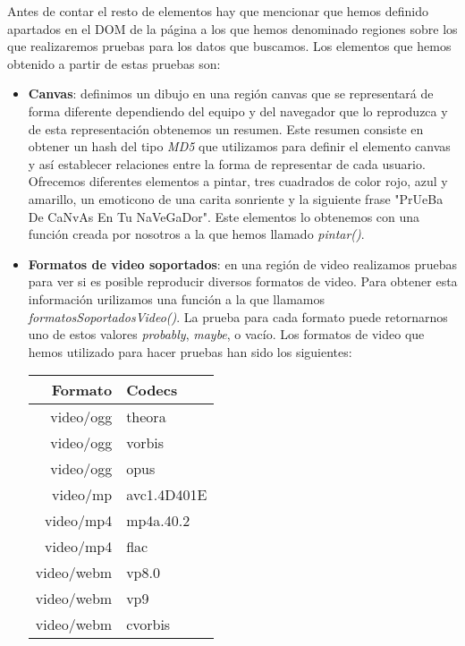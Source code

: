 \noindent  Antes de contar el resto de elementos hay que mencionar que hemos definido apartados en el DOM de la página a los que hemos denominado regiones sobre los que realizaremos pruebas para los datos que buscamos. Los elementos que hemos obtenido a partir de estas pruebas son:
\begin{itemize} 
    \item \textbf{Canvas}: definimos un dibujo en una región canvas que se representará de forma diferente dependiendo del equipo y del navegador que lo reproduzca y de esta representación obtenemos un resumen. Este resumen consiste en obtener un hash del tipo \textit{MD5} que utilizamos para definir el elemento canvas y así establecer relaciones entre la forma de representar de cada usuario. Ofrecemos diferentes elementos a pintar, tres cuadrados de color rojo, azul y amarillo, un emoticono de una carita sonriente y la siguiente frase "PrUeBa De CaNvAs En Tu NaVeGaDor". Este elementos lo obtenemos con una función creada por nosotros a la que hemos llamado \textit{pintar()}.
    \item \textbf{Formatos de video soportados}: en una región de video realizamos pruebas para ver si es posible reproducir diversos formatos de video. Para obtener esta información urilizamos una función a la que llamamos \textit{formatosSoportadosVideo()}. La prueba para cada formato puede retornarnos uno de estos valores \textit{probably}, \textit{maybe}, o vacío. Los formatos de video que hemos utilizado para hacer pruebas han sido los siguientes:
    \begin{table}[H]
        \begin{center}
            \begin{tabular}{ r | l }
            \textbf{Formato} & \textbf{Codecs} \\ \hline
            video/ogg & theora \\
            video/ogg & vorbis \\
            video/ogg & opus \\
            video/mp & avc1.4D401E \\
            video/mp4 & mp4a.40.2 \\
            video/mp4 & flac \\
            video/webm & vp8.0 \\
            video/webm & vp9 \\
            video/webm & cvorbis \\
            \end{tabular}
        \end{center}

\end{table}
\end{itemize}
